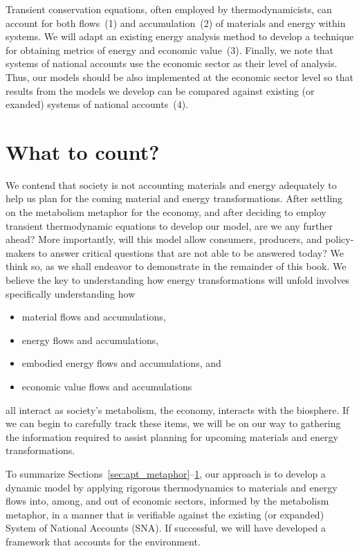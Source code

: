 Transient conservation equations, often employed by thermodynamicists, 
can account for both flows~(1) and accumulation~(2) of materials
and energy within systems.
We will adapt an existing energy analysis method to develop a 
technique for obtaining metrics of energy and economic value~(3).
Finally, we note that systems of national accounts use the economic sector
as their level of analysis. 
Thus, our models should be also implemented at the economic sector level
so that results from the models we develop can be 
compared against existing (or exanded) systems of national accounts~(4).


\section{What to count?}
\label{sec:what_to_count}

We contend that society is not accounting materials and energy adequately 
to help us plan for the coming material and energy transformations.
After settling on the metabolism metaphor for the economy, 
and after deciding to employ transient thermodynamic equations to develop our model, 
are we any further ahead?
More importantly, will this model allow consumers, producers,
and policy-makers to answer critical questions that  are not
able to be answered today? 
We think so, as we shall endeavor to demonstrate in the remainder of this book.
We believe the key to understanding how energy transformations will unfold
involves specifically understanding how 

\begin{itemize}
	\item{material flows and accumulations,}
	\item{energy flows and accumulations,}
	\item{embodied energy flows and accumulations, and}
	\item{economic value flows and accumulations}
\end{itemize}

\noindent{}all interact as society's metabolism, the economy,
interacts with the biosphere.
If we can begin to carefully track these items, 
we will be on our way to gathering the information required to 
assist planning for upcoming materials and energy transformations.

To summarize Sections~\ref{sec:apt_metaphor}--\ref{sec:what_to_count}, 
our approach is to develop a dynamic model 
by applying rigorous thermodynamics 
to materials and energy flows into, among, and out of economic sectors,
informed by the metabolism metaphor,
in a manner that is verifiable against 
the existing (or expanded) System of National Accounts (SNA).
If successful, we will have developed a framework 
that accounts for the environment. 


